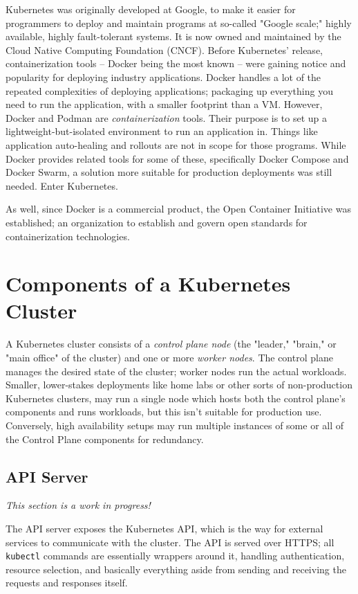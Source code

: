 \documentclass[11pt, a4paper]{article}
\begin{document}
Kubernetes was originally developed at Google, to make it easier for programmers to deploy and maintain programs at so-called "Google scale;" highly available, highly fault-tolerant systems. It is now owned and maintained by the Cloud Native Computing Foundation (CNCF). Before Kubernetes' release, containerization tools -- Docker being the most known -- were gaining notice and popularity for deploying industry applications. Docker handles a lot of the repeated complexities of deploying applications; packaging up everything you need to run the application, with a smaller footprint than a VM. However, Docker and Podman are \textit{containerization} tools. Their purpose is to set up a lightweight-but-isolated environment to run an application in. Things like application auto-healing and rollouts are not in scope for those programs. While Docker provides related tools for some of these, specifically Docker Compose and Docker Swarm, a solution more suitable for production deployments was still needed. Enter Kubernetes.

As well, since Docker is a commercial product, the Open Container Initiative was established; an organization to establish and govern open standards for containerization technologies.  

\section{Components of a Kubernetes Cluster}

A Kubernetes cluster consists of a \textit{control plane node} (the "leader," "brain," or "main office" of the cluster) and one or more \textit{worker nodes}. The control plane manages the desired state of the cluster; worker nodes run the actual workloads. Smaller, lower-stakes deployments like home labs or other sorts of non-production Kubernetes clusters, may run a single node which hosts both the control plane's components and runs workloads, but this isn't suitable for production use. Conversely, high availability setups may run multiple instances of some or all of the Control Plane components for redundancy.

\subsection{API Server}

\textit{This section is a work in progress!}

The API server exposes the Kubernetes API, which is the way for external services to communicate with the cluster. The API is served over HTTPS; all \texttt{kubectl} commands are essentially wrappers around it, handling authentication, resource selection, and basically everything aside from sending and receiving the requests and responses itself.
\end{document}
